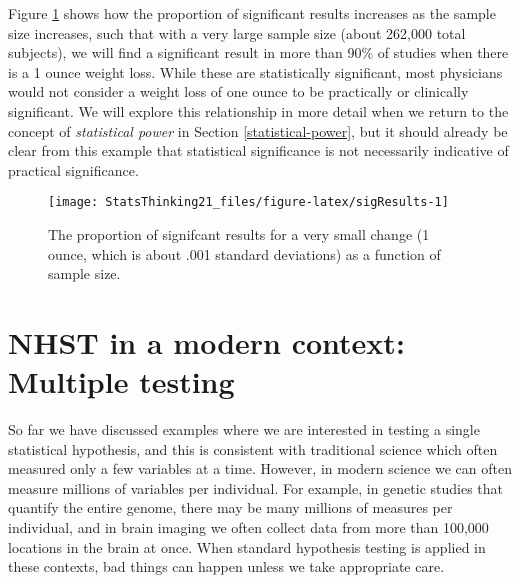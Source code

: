 \documentclass[]{book}
\newenvironment{Shaded}{\begin{snugshade}}{\end{snugshade}}
\newcommand{\KeywordTok}[1]{\textcolor[rgb]{0.13,0.29,0.53}{\textbf{#1}}}
\newcommand{\DataTypeTok}[1]{\textcolor[rgb]{0.13,0.29,0.53}{#1}}
\newcommand{\StringTok}[1]{\textcolor[rgb]{0.31,0.60,0.02}{#1}}
\newcommand{\OperatorTok}[1]{\textcolor[rgb]{0.81,0.36,0.00}{\textbf{#1}}}
\newcommand{\NormalTok}[1]{#1}
\theoremstyle{definition}
\theoremstyle{definition}
\theoremstyle{definition}
\theoremstyle{remark}
\begin{document}
\begin{Shaded}
\end{Shaded}

Figure \ref{fig:sigResults} shows how the proportion of significant
results increases as the sample size increases, such that with a very
large sample size (about 262,000 total subjects), we will find a
significant result in more than 90\% of studies when there is a 1 ounce
weight loss. While these are statistically significant, most physicians
would not consider a weight loss of one ounce to be practically or
clinically significant. We will explore this relationship in more detail
when we return to the concept of \emph{statistical power} in Section
\ref{statistical-power}, but it should already be clear from this
example that statistical significance is not necessarily indicative of
practical significance.

\begin{figure}
\texttt{[image: StatsThinking21\_files/figure-latex/sigResults-1]} \caption{The proportion of signifcant results for a very small change (1 ounce, which is about .001 standard deviations) as a function of sample size.}\label{fig:sigResults}
\end{figure}

\section{NHST in a modern context: Multiple
testing}\label{nhst-in-a-modern-context-multiple-testing}

So far we have discussed examples where we are interested in testing a
single statistical hypothesis, and this is consistent with traditional
science which often measured only a few variables at a time. However, in
modern science we can often measure millions of variables per
individual. For example, in genetic studies that quantify the entire
genome, there may be many millions of measures per individual, and in
brain imaging we often collect data from more than 100,000 locations in
the brain at once. When standard hypothesis testing is applied in these
contexts, bad things can happen unless we take appropriate care.
\end{document}
